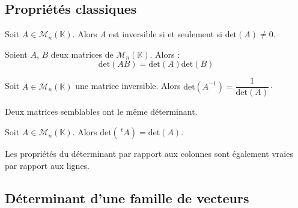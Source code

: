 \documentclass[french,11pt,twoside]{VcCours}
\begin{document}
\subsection{Propriétés classiques}

\begin{Proposition}{} Soit $A \in \mathcal{M}_n(\mathbb{K})$. Alors $A$ est inversible si et seulement si $\textrm{det}(A) \neq 0$.
\end{Proposition}

\begin{Proposition}{} Soient $A$, $B$ deux matrices de $\mathcal{M}_n(\mathbb{K})$. Alors :
$$ \textrm{det}(AB) = \textrm{det}(A) \textrm{det}(B)$$
\end{Proposition}

\begin{Corollaire}{} Soit $A \in \mathcal{M}_n(\mathbb{K})$ une matrice inversible. Alors $\textrm{det}(A^{-1}) = \dfrac{1}{\textrm{det}(A)}
\cdot$
\end{Corollaire}

\begin{Proposition}{} Deux matrices semblables ont le même déterminant.
\end{Proposition}

\begin{Demonstration}{} 
\vspace{4cm}
\end{Demonstration}

\begin{Proposition}{} Soit $A \in \mathcal{M}_n(\mathbb{K})$. Alors $\textrm{det}(~^tA) = \textrm{det}(A)$.
\end{Proposition}

\begin{Corollaire}{} Les propriétés du déterminant par rapport aux colonnes sont également vraies par rapport aux lignes.
\end{Corollaire}

\subsection{Déterminant d'une famille de vecteurs}
\end{document}
